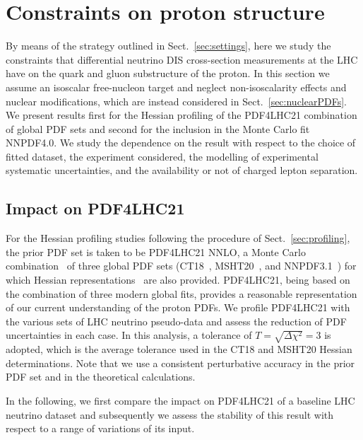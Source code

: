 \clearpage
\section{Constraints on proton structure}
\label{sec:protonPDFs}

By means of the strategy outlined in Sect.~\ref{sec:settings}, here we study the constraints that differential neutrino DIS
cross-section measurements at the LHC have on the quark and gluon substructure of the proton.
%
In this section we assume an isoscalar free-nucleon target and neglect non-isoscalarity effects and nuclear modifications,
which are instead considered in Sect.~\ref{sec:nuclearPDFs}.
%
We present results first for the Hessian profiling of the PDF4LHC21 combination of global PDF sets
and second for the inclusion in the Monte Carlo fit NNPDF4.0.
%
We study the dependence on the result with respect to the choice of fitted dataset, the experiment considered,
the modelling of experimental systematic uncertainties, and the availability or not of charged lepton separation.

\subsection{Impact on PDF4LHC21}
\label{sec:pdf4lhc21}

For the Hessian profiling studies following the procedure of Sect.~\ref{sec:profiling}, the prior PDF set is taken to
be PDF4LHC21 NNLO, a Monte Carlo combination~\cite{Watt:2012tq,Carrazza:2015hva} of three global PDF sets (CT18~\cite{Hou:2019efy},
MSHT20~\cite{Bailey:2020ooq}, and NNPDF3.1~\cite{NNPDF:2017mvq}) for which Hessian
representations~\cite{Gao:2013bia,Carrazza:2015aoa} are also provided.
%
PDF4LHC21, being based on the combination of three modern global fits, provides a reasonable representation
of our current understanding of the proton PDFs.
%
We profile PDF4LHC21 with the various sets of LHC neutrino pseudo-data and assess the reduction
of PDF uncertainties in each case.
%
In this analysis, a tolerance of $T = \sqrt{\Delta \chi^2}=3$ is adopted, which is the average tolerance
used in the CT18 and MSHT20 Hessian determinations.
%
Note that we use a consistent perturbative accuracy in the prior PDF set and in the theoretical calculations.

In the following, we first compare the impact on PDF4LHC21 of a baseline LHC neutrino dataset and subsequently
we assess the stability of this result with respect to a range of variations of its input.

